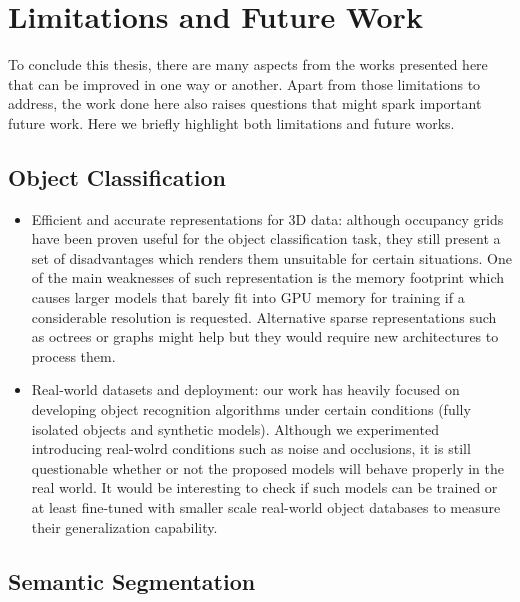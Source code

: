 \section{Limitations and Future Work}
\label{cha:conclusion:sec:future}

To conclude this thesis, there are many aspects from the works presented here that can be improved in one way or another. Apart from those limitations to address, the work done here also raises questions that might spark important future work. Here we briefly highlight both limitations and future works.

\subsection{Object Classification}

\begin{itemize}
    \item Efficient and accurate representations for 3D data: although occupancy grids have been proven useful for the object classification task, they still present a set of disadvantages which renders them unsuitable for certain situations. One of the main weaknesses of such representation is the memory footprint which causes larger models that barely fit into \ac{GPU} memory for training if a considerable resolution is requested. Alternative sparse representations such as octrees or graphs might help but they would require new architectures to process them.
    \item Real-world datasets and deployment: our work has heavily focused on developing object recognition algorithms under certain conditions (fully isolated objects and synthetic models). Although we experimented introducing real-wolrd conditions such as noise and occlusions, it is still questionable whether or not the proposed models will behave properly in the real world. It would be interesting to check if such models can be trained or at least fine-tuned with smaller scale real-world object databases to measure their generalization capability.
\end{itemize}

\subsection{Semantic Segmentation}

